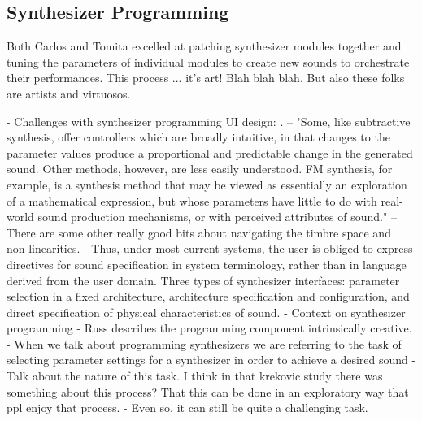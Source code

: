 
\subsection{Synthesizer Programming}
Both Carlos and Tomita excelled at patching synthesizer modules together and tuning the parameters of individual modules to create new sounds to orchestrate their performances. This process ... it's art! Blah blah blah. But also these folks are artists and virtuosos.

- Challenges with synthesizer programming UI design: \cite{seago2013new}. -- "Some, like subtractive synthesis, offer controllers which are broadly intuitive, in that changes to the parameter values produce a proportional and predictable change in the generated sound. Other methods, however, are less easily understood. FM synthesis, for example, is a synthesis method that may be viewed as essentially an exploration of a mathematical expression, but whose parameters have little to do with real-world sound production mechanisms, or with perceived attributes of sound." -- There are some other really good bits about navigating the timbre space and non-linearities.
- \cite{seago2004critical} Thus, under most current systems, the user is obliged to express directives for sound specification in system terminology, rather than in language derived from the user domain. Three types of synthesizer interfaces: parameter selection in a fixed architecture, architecture specification and configuration, and direct specification of physical characteristics of sound.
- Context on synthesizer programming \cite{jenkins2019analog}
- Russ describes the programming component intrinsically creative.
- When we talk about programming synthesizers we are referring to the task of selecting parameter settings for a synthesizer in order to achieve a desired sound
- Talk about the nature of this task. I think in that krekovic study there was something about this process? That this can be done in an exploratory way that ppl enjoy that process.
- Even so, it can still be quite a challenging task.

